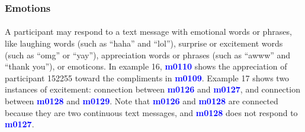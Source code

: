 \documentclass{article}
\begin{document}
\subsubsection{Emotions}
\paragraph{}
A participant may respond to a text message with emotional words or phrases, like laughing words (such as ``haha'' and ``lol''), surprise or excitement words (such as ``omg'' or ``yay''), appreciation words or phrases (such as ``awww'' and ``thank you''), or emoticons. In example 16, \textbf{\textcolor{blue}{m0110}} shows the appreciation of participant 152255 toward the compliments in  \textbf{\textcolor{blue}{m0109}}. Example 17 shows two instances of excitement: connection between \textbf{\textcolor{blue}{m0126}} and \textbf{\textcolor{blue}{m0127}}, and connection between \textbf{\textcolor{blue}{m0128}} and \textbf{\textcolor{blue}{m0129}}. Note that \textbf{\textcolor{blue}{m0126}} and \textbf{\textcolor{blue}{m0128}} are connected because they are two continuous text messages, and \textbf{\textcolor{blue}{m0128}} does not respond to \textbf{\textcolor{blue}{m0127}}. 
\end{document}
